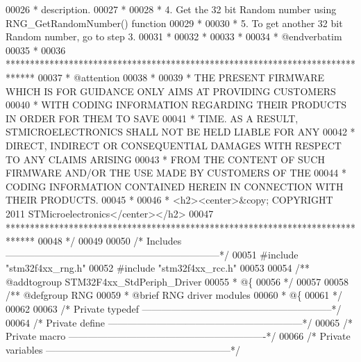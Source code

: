 \begin{DoxyCode}
00026 \textcolor{comment}{  *            description.}
00027 \textcolor{comment}{  *           }
00028 \textcolor{comment}{  *          4. Get the 32 bit Random number using RNG\_GetRandomNumber() function}
00029 \textcolor{comment}{  *          }
00030 \textcolor{comment}{  *          5. To get another 32 bit Random number, go to step 3.       }
00031 \textcolor{comment}{  *}
00032 \textcolor{comment}{  *         }
00033 \textcolor{comment}{  *              }
00034 \textcolor{comment}{  *  @endverbatim}
00035 \textcolor{comment}{  *         }
00036 \textcolor{comment}{  ******************************************************************************}
00037 \textcolor{comment}{  * @attention}
00038 \textcolor{comment}{  *}
00039 \textcolor{comment}{  * THE PRESENT FIRMWARE WHICH IS FOR GUIDANCE ONLY AIMS AT PROVIDING CUSTOMERS}
00040 \textcolor{comment}{  * WITH CODING INFORMATION REGARDING THEIR PRODUCTS IN ORDER FOR THEM TO SAVE}
00041 \textcolor{comment}{  * TIME. AS A RESULT, STMICROELECTRONICS SHALL NOT BE HELD LIABLE FOR ANY}
00042 \textcolor{comment}{  * DIRECT, INDIRECT OR CONSEQUENTIAL DAMAGES WITH RESPECT TO ANY CLAIMS ARISING}
00043 \textcolor{comment}{  * FROM THE CONTENT OF SUCH FIRMWARE AND/OR THE USE MADE BY CUSTOMERS OF THE}
00044 \textcolor{comment}{  * CODING INFORMATION CONTAINED HEREIN IN CONNECTION WITH THEIR PRODUCTS.}
00045 \textcolor{comment}{  *}
00046 \textcolor{comment}{  * <h2><center>&copy; COPYRIGHT 2011 STMicroelectronics</center></h2>}
00047 \textcolor{comment}{  ******************************************************************************  }
00048 \textcolor{comment}{  */}
00049 
00050 \textcolor{comment}{/* Includes ------------------------------------------------------------------*/}
00051 \textcolor{preprocessor}{#}\textcolor{preprocessor}{include} "stm32f4xx_rng.h"
00052 \textcolor{preprocessor}{#}\textcolor{preprocessor}{include} "stm32f4xx_rcc.h"
00053 
00054 \textcolor{comment}{/** @addtogroup STM32F4xx\_StdPeriph\_Driver}
00055 \textcolor{comment}{  * @\{}
00056 \textcolor{comment}{  */}
00057 
00058 \textcolor{comment}{/** @defgroup RNG }
00059 \textcolor{comment}{  * @brief RNG driver modules}
00060 \textcolor{comment}{  * @\{}
00061 \textcolor{comment}{  */}
00062 
00063 \textcolor{comment}{/* Private typedef -----------------------------------------------------------*/}
00064 \textcolor{comment}{/* Private define ------------------------------------------------------------*/}
00065 \textcolor{comment}{/* Private macro -------------------------------------------------------------*/}
00066 \textcolor{comment}{/* Private variables ---------------------------------------------------------*/}

\end{DoxyCode}
